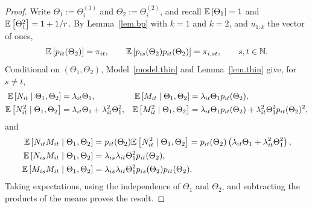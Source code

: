 \begin{proof}
Write \(\Theta_1:=\Theta_i^{(1)}\) and \(\Theta_2:=\Theta_i^{(2)}\), and
recall \({\mathbb E}\left[\Theta_1\right]=1\) and \({\mathbb E}\left[\Theta_1^2\right]=1+1/r\). By
Lemma~\ref{lem.bp} with \(k=1\) and \(k=2\), and \(u_{1:k}\) the
vector of ones,
\[
{\mathbb E}\left[p_{it}(\Theta_2)\right]=\pi_{it},
\qquad
{\mathbb E}\left[p_{is}(\Theta_2)p_{it}(\Theta_2)\right]=\pi_{i,st},
\qquad s,t\in\mathbb N.
\]
Conditional on \((\Theta_1,\Theta_2)\), Model~\ref{model.thin} and
Lemma~\ref{lem.thin} give, for \(s\neq t\),
\[
\begin{aligned}
{\mathbb E}\left[N_{it}\mid\Theta_1,\Theta_2\right]&=\lambda_{it}\Theta_1,
&
{\mathbb E}\left[M_{it}\mid\Theta_1,\Theta_2\right]&=\lambda_{it}\Theta_1p_{it}(\Theta_2),\\
{\mathbb E}\left[N_{it}^2\mid\Theta_1,\Theta_2\right]&=\lambda_{it}\Theta_1+\lambda_{it}^2\Theta_1^2,
&
{\mathbb E}\left[M_{it}^2\mid\Theta_1,\Theta_2\right]&=\lambda_{it}\Theta_1p_{it}(\Theta_2)
+\lambda_{it}^2\Theta_1^2p_{it}(\Theta_2)^2,
\end{aligned}
\]
and
\[
\begin{aligned}
{\mathbb E}\left[N_{it}M_{it}\mid\Theta_1,\Theta_2\right]
&=
p_{it}(\Theta_2){\mathbb E}\left[N_{it}^2\mid\Theta_1,\Theta_2\right]
=
p_{it}(\Theta_2)\left(\lambda_{it}\Theta_1+\lambda_{it}^2\Theta_1^2\right),\\
{\mathbb E}\left[N_{is}M_{it}\mid\Theta_1,\Theta_2\right]
&=
\lambda_{is}\lambda_{it}\Theta_1^2p_{it}(\Theta_2),\\
{\mathbb E}\left[M_{is}M_{it}\mid\Theta_1,\Theta_2\right]
&=
\lambda_{is}\lambda_{it}\Theta_1^2p_{is}(\Theta_2)p_{it}(\Theta_2).
\end{aligned}
\]
Taking expectations, using the independence of \(\Theta_1\) and
\(\Theta_2\), and subtracting the products of the means proves the
result.
\end{proof}

